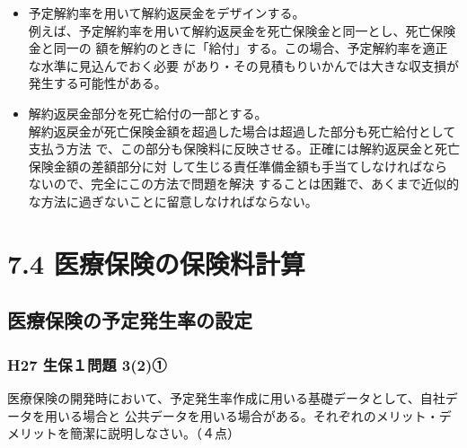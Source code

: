 \documentclass[report,gutter=10mm,fore-edge=10mm,uplatex,dvipdfmx]{jlreq}
\begin{document}
\begin{itemize}
\begin{itemize}
 \item 予定解約率を用いて解約返戻金をデザインする。\\
例えば、予定解約率を用いて解約返戻金を死亡保険金と同一とし、死亡保険金と同一の
額を解約のときに「給付」する。この場合、予定解約率を適正な水準に見込んでおく必要
があり・その見積もりいかんでは大きな収支損が発生する可能性がある。
 \item 解約返戻金部分を死亡給付の一部とする。\\
解約返戻金が死亡保険金額を超過した場合は超過した部分も死亡給付として支払う方法
で、この部分も保険料に反映させる。正確には解約返戻金と死亡保険金額の差額部分に対
して生じる責任準備金額も手当てしなければならないので、完全にこの方法で問題を解決
することは困難で、あくまで近似的な方法に過ぎないことに留意しなければならない。
\end{itemize}
\end{itemize}
\section{7.4 医療保険の保険料計算}
\subsection{医療保険の予定発生率の設定}
\subsubsection{H27 生保１問題 3(2)①}
医療保険の開発時において、予定発生率作成に用いる基礎データとして、自社データを用いる場合と
公共データを用いる場合がある。それぞれのメリット・デメリットを簡潔に説明しなさい。（４点）
\end{document}
